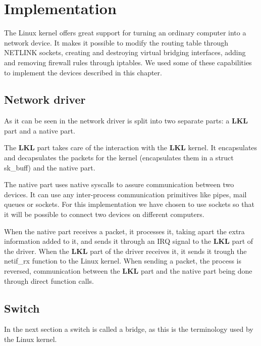\chapter{Implementation}
\label{chapter:impl}

The Linux kernel offers great support for turning an ordinary
computer into a network device. It makes it possible to modify the routing 
table through NETLINK sockets, creating and destroying virtual 
bridging interfaces, adding and removing firewall rules through 
iptables. We used some of these capabilities to implement the 
devices described in this chapter.

\section{Network driver}
\label{sec:net-driver}


As it can be seen in  the network driver is split into two separate parts: a \textbf{LKL} part 
and a native part.

The \textbf{LKL} part takes care of the interaction with the \textbf{LKL} kernel.
It encapsulates and decapsulates the packets for the kernel
(encapsulates them in a struct sk_buff) and the native part.

The native part uses native syscalls to assure communication 
between two devices. It can use any inter-process communication 
primitives like pipes, mail queues or sockets.
For this implementation we have chosen to use 
sockets so that it will be possible to connect two devices 
on different computers.

When the native part receives a packet, it processes it, taking apart
the extra information added to it,  and sends it through an IRQ signal
to the \textbf{LKL} part of the driver. When the \textbf{LKL} part of the driver receives it,
it sends it trough the netif_rx function to the Linux kernel. When sending
a packet, the process is reversed, communication between the \textbf{LKL} part and the
native part being done through direct function calls.

\section{Switch}
\label{sec:switch-impl}

In the next section a switch is called a bridge, as this is the terminology used by the Linux kernel.

